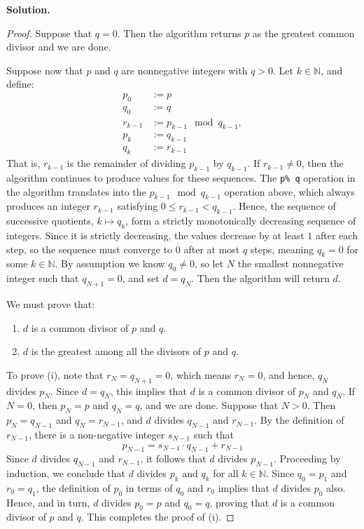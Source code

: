 \documentclass[12pt, a4paper]{article}
\newenvironment{sol}[1][Solution]
{\par\medskip\noindent \textbf{#1.} }
{\medskip}
\begin{document}
	\begin{sol}
		\
		\begin{proof}
			Suppose that $q = 0$. Then the algorithm returns $p$ as the  greatest common
			divisor and we are done.
			
			Suppose now that $p$ and $q$ are nonnegative integers with $q>0$.
			Let $k\in \mathbb{N}$, and define:
			\begin{align*}
				p_0 & := p \\
				q_0 & := q \\
				r_{k-1} & := p_{k-1} \mod q_{k-1},\\
				p_{k} & := q_{k-1} \\
				q_{k} & := r_{k-1}
			\end{align*}
			That is, $r_{k-1}$ is the remainder of dividing $p_{k-1}$ by $q_{k-1}$.
			If $r_{k-1}\neq 0$, then the algorithm continues to produce values for
			these sequences. The \texttt{p\% q} operation in the algorithm translates into
			the $p_{k-1}\mod q_{k-1}$ operation above, which  always produces an integer $r_{k-1}$
			satisfying $0 \leq r_{k-1} < q_{k-1}$. Hence, the sequence of successive quotients,
			$k\mapsto q_k$, form a strictly monotonically decreasing sequence of integers.
			Since it is strictly decreasing, the values decrease by at least $1$ after each
			step, so the sequence must converge to $0$ after at most $q$ steps, meaning
			$q_k=0$ for some $k\in\mathbb{N}$. By assumption we  know $q_0 \neq 0$, so
			let $N$ the smallest nonnegative integer such that $q_{N + 1} = 0$, and set $d = q_N$.
			Then the algorithm will return $d$.
			
			We must prove that:
			\begin{enumerate}[label=(\roman*)]
				\item $d$ is a common divisor of $p$ and $q$.
				\item $d$ is the greatest among all the divisors of $p$ and $q$.
			\end{enumerate}
			To prove (i), note that $r_N = q_{N+1} = 0$, which means $r_N = 0$, and hence,
			$q_N$ divides $p_N$. Since $d = q_N$, this implies that $d$ is a common divisor
			of $p_N$ and $q_N$. If $N=0$, then $p_N=p$ and $q_N=q$, and we are done. Suppose
			that $N > 0$. Then $p_N = q_{N-1}$ and $q_N = r_{N-1}$, and $d$ divides $q_{N-1}$
			and $r_{N-1}$. By the definition  of $r_{N-1}$, there is a non-negative integer
			$s_{N-1}$ such that
			\[
			p_{N-1} = s_{N-1} \cdot q_{N-1} + r_{N-1}
			\]
			Since $d$ divides $q_{N-1}$ and $r_{N-1}$, it follows  that $d$ divides $p_{N-1}$.
			Proceeding by induction, we conclude that $d$ divides $p_k$ and $q_k$ for all
			$k\in\mathbb{N}$. Since $q_{0}=p_1$ and $r_0=q_1$, the definition of $p_0$ in terms
			of $q_0$ and $r_0$ implies that $d$ divides $p_0$ also. Hence, and in turn, $d$ divides
			$p_0 = p$ and $q_0 = q$, proving that $d$ is a common divisor of $p$ and $q$.
			This completes the proof of (i).
			

\end{proof}
\end{sol}
\end{document}
